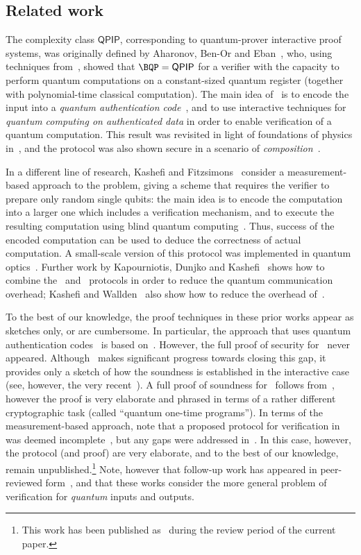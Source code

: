 \documentclass{toc}
\newcommand{\QPIP}{\mathsf{QPIP}}
\begin{document}
\subsection{Related work}
\label{sec:related-work}

The complexity class $\QPIP$, corresponding to quantum-prover interactive proof systems, was originally defined by Aharonov, Ben-Or and Eban~\cite{ABE10}, who, using techniques from~\cite{BCG+06}, showed that $\BQP = \QPIP$ for a verifier with the capacity to perform  quantum computations on a constant-sized quantum register (together with polynomial-time classical computation). The main idea of~\cite{ABE10} is to encode the input into a \emph{quantum authentication code}~\cite{BCG+02}, and to use interactive techniques for \emph{quantum computing on authenticated data} in order to enable verification of a  quantum computation.
  This result was revisited in light of foundations of physics in~\cite{AV14}, and the protocol was also shown secure in a scenario of \emph{composition}~\cite{BGS13}.

In a different line of research, Kashefi and Fitzsimons~\cite{FK12} consider a measurement-based approach to the problem, giving a scheme that  requires the verifier to prepare only random single qubits: the main idea is to encode the computation into a larger one which includes a verification mechanism, and to execute the resulting computation using blind quantum computing~\cite{BFK09}. Thus, success of the encoded computation can be used to deduce the correctness of actual computation. A small-scale version of this protocol was implemented in quantum optics~\cite{BFKW13}. Further work by Kapourniotis,  Dunjko and Kashefi~\cite{KDK15} shows how to combine the~\cite{ABE10} and~\cite{FK12} protocols in order to reduce the quantum communication overhead; Kashefi and  Wallden~\cite{KW15} also show how to reduce the overhead of~\cite{FK12}.

To the best of our knowledge,  the proof techniques in these prior works appear as sketches only, or are cumbersome. In particular, the approach that uses quantum authentication codes~\cite{ABE10} is based on~\cite{BCG+06}. However, the full proof of security for~\cite{BCG+06} never appeared. Although~\cite{ABE10} makes significant progress towards closing this gap, it provides only a sketch of how the soundness is established in the interactive case (see, however, the very recent~\cite{ABEM17}). A full proof of soundness for~\cite{ABE10} follows from~\cite{BGS13}, however the proof is very elaborate and phrased in terms of a rather different cryptographic task (called  ``quantum one-time programs'').
In terms of the measurement-based approach, note that a proposed protocol for verification in~\cite{BFK09} was deemed incomplete~\cite{FK12}, but any gaps were addressed in~\cite{FK12}. In this case, however, the protocol (and proof) are very elaborate, and to the best of our knowledge, remain unpublished.\footnote{This work has been published as~\cite{FK17} during the review period of the current paper.} Note, however that follow-up work has appeared in peer-reviewed form~\cite{KDK15,KW15}, and that these works consider the more general problem of verification for \emph{quantum} inputs and outputs.
\end{document}
